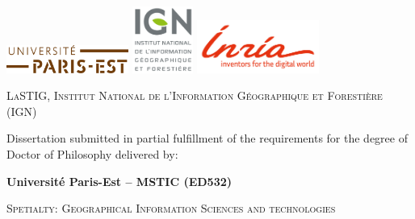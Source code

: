 \begin{titlepage}
    \begin{center}
        \includegraphics[width=4cm]{images/logos/paris-est_logo}
        \includegraphics[width=2cm]{images/logos/ign_logo}
        \includegraphics[width=4cm]{images/logos/inr_logo_eng_rouge_150}\\
    
        \vspace*{10mm}

        \begin{minipage}{.5\textwidth}
            \centering
            \textsc{LaSTIG, Institut National de l'Information Géographique et Forestière (IGN)}
        \end{minipage}

        \vspace*{10mm}

        Dissertation submitted in partial fulfillment of the requirements for the degree of Doctor of Philosophy delivered by:

        \vspace*{5mm}

        \begin{LARGE}
            \textbf{Université Paris-Est -- MSTIC (ED532)}
        \end{LARGE}

        \vspace*{10mm}
        \begin{large}
            \textsc{Spetialty: Geographical Information Sciences and technologies}
        \end{large}
        \vspace*{10mm}


\end{center}
\end{titlepage}
